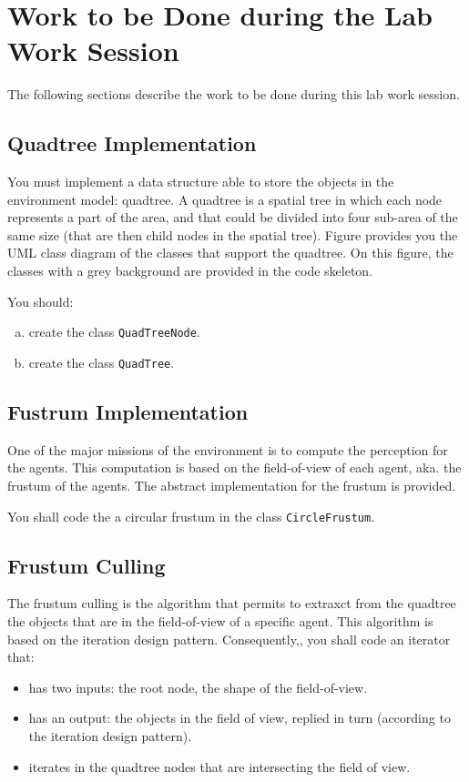 \documentclass[article,english,nodocumentinfo]{multiagentfrreport}
\begin{document}
\section{Work to be Done during the Lab Work Session}

The following sections describe the work to be done during this lab work session.

\subsection{Quadtree Implementation}

You must implement a data structure able to store the objects in the environment model: quadtree.
A quadtree is a spatial tree in which each node represents a part of the area, and that could be divided into four sub-area of the same size (that are then child nodes in the spatial tree).
Figure  provides you the UML class diagram of the classes that support the quadtree. On this figure, the classes with a grey background are provided in the code skeleton.


You should:
\begin{enumerate}[a)]
\item create the class \texttt{QuadTreeNode}.
\item create the class \texttt{QuadTree}.
\end{enumerate}

\subsection{Fustrum Implementation}

One of the major missions of the environment is to compute the perception for the agents.
This computation is based on the field-of-view of each agent, aka. the frustum of the agents.
The abstract implementation for the frustum is provided.

You shall code the a circular frustum in the class \texttt{CircleFrustum}.

\subsection{Frustum Culling}

The frustum culling is the algorithm that permits to extraxct from the quadtree the objects that are in the field-of-view of a specific agent.
This algorithm is based on the iteration design pattern.
Consequently,, you shall code an iterator that:
\begin{itemize}
\item has two inputs: the root node, the shape of the field-of-view.
\item has an output: the objects in the field of view, replied in turn (according to the iteration design pattern).
\item iterates in the quadtree nodes that are intersecting the field of view.
\end{itemize}
\end{document}
